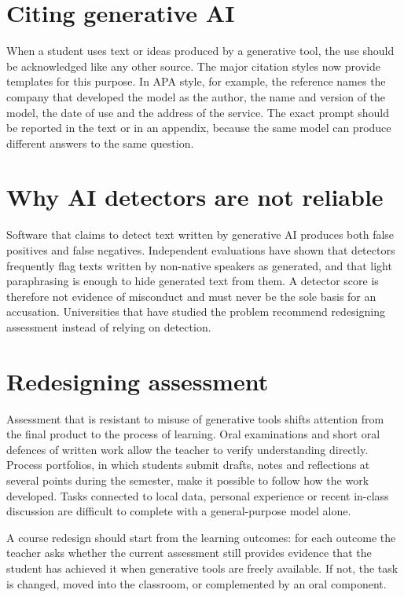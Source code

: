 \documentclass[11pt,a4paper]{article}
\begin{document}
\section{Citing generative AI}

When a student uses text or ideas produced by a generative tool, the use
should be acknowledged like any other source. The major citation styles now
provide templates for this purpose. In APA style, for example, the reference
names the company that developed the model as the author, the name and
version of the model, the date of use and the address of the service. The
exact prompt should be reported in the text or in an appendix, because the
same model can produce different answers to the same question.

\section{Why AI detectors are not reliable}

Software that claims to detect text written by generative AI produces both
false positives and false negatives. Independent evaluations have shown that
detectors frequently flag texts written by non-native speakers as generated,
and that light paraphrasing is enough to hide generated text from them.
A detector score is therefore not evidence of misconduct and must never be
the sole basis for an accusation. Universities that have studied the problem
recommend redesigning assessment instead of relying on detection.

\section{Redesigning assessment}

Assessment that is resistant to misuse of generative tools shifts attention
from the final product to the process of learning. Oral examinations and
short oral defences of written work allow the teacher to verify
understanding directly. Process portfolios, in which students submit drafts,
notes and reflections at several points during the semester, make it
possible to follow how the work developed. Tasks connected to local data,
personal experience or recent in-class discussion are difficult to complete
with a general-purpose model alone.

A course redesign should start from the learning outcomes: for each outcome
the teacher asks whether the current assessment still provides evidence that
the student has achieved it when generative tools are freely available. If
not, the task is changed, moved into the classroom, or complemented by an
oral component.
\end{document}
